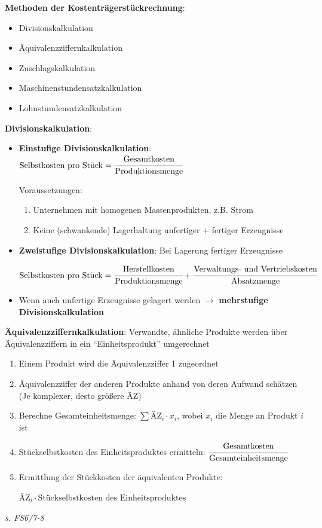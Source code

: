 \textbf{Methoden der Kostenträgerstückrechnung}:
\begin{itemize}
	\item Divisionskalkulation
	\item Äquivalenzziffernkalkulation
	\item Zuschlagskalkulation
	\item Maschinenstundensatzkalkulation
	\item Lohnstundensatzkalkulation
\end{itemize}
\bigskip
\textbf{Divisionskalkulation}:
\begin{itemize}
	\item \textbf{Einstufige Divisionskalkulation}: $\text{Selbstkosten pro Stück}=\cfrac{\text{Gesamtkosten}}{\text{Produktionsmenge}}$
	
	Voraussetzungen: 
	\begin{enumerate}
		\item Unternehmen mit homogenen Massenprodukten, z.B. Strom
		\item Keine (schwankende) Lagerhaltung unfertiger + fertiger Erzeugnisse
	\end{enumerate}

	\item \textbf{Zweistufige Divisionskalkulation}: Bei Lagerung fertiger Erzeugnisse
	\begin{tightcenter}
		$\text{Selbstkosten pro Stück}=
		\cfrac{\text{Herstellkosten}}{\text{Produktionsmenge}}+
		\cfrac{\text{Verwaltungs- und Vertriebskosten}}{\text{Absatzmenge}}$
	\end{tightcenter}
	\item Wenn auch unfertige Erzeugnisse gelagert werden $\rightarrow$ \textbf{mehrstufige Divisionskalkulation}
\end{itemize}
\bigskip
\textbf{Äquivalenzziffernkalkulation}: Verwandte, ähnliche Produkte werden über Äquivalenzziffern in ein \enquote{Einheitsprodukt} umgerechnet
\begin{enumerate}
	\item Einem Produkt wird die Äquivalenzziffer 1 zugeordnet
	\item Äquivalenzziffer der anderen Produkte anhand von deren Aufwand schätzen (Je komplexer, desto größere ÄZ)
	\item Berechne Gesamteinheitsmenge: $\sum\text{ÄZ}_i\cdot x_i$, wobei $x_i$ die Menge an Produkt $i$ ist
	\item Stückselbstkosten des Einheitsproduktes ermitteln: $\cfrac{\text{Gesamtkosten}}{\text{Gesamteinheitsmenge}}$
	\item Ermittlung der Stückkosten der äquivalenten Produkte:
	\begin{tightcenter}
		$\text{ÄZ}_i\cdot \text{Stückselbstkosten des Einheitsproduktes}$
	\end{tightcenter}
\end{enumerate}
\textit{s. FS6/7-8}\\

